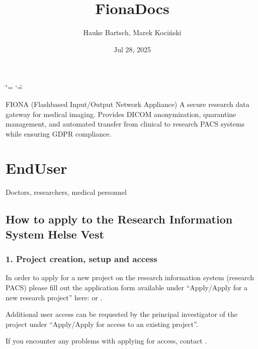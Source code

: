 \documentclass[letterpaper,10pt,english]{sphinxmanual}
\title{FionaDocs}
\date{Jul 28, 2025}
\author{Hauke Bartsch, Marek Kociński}
\begin{document}
\ifdefined\shorthandoff
  \ifnum\catcode`\=\string=\active\shorthandoff{=}\fi
  \ifnum\catcode`\"=\active{}\fi
\fi

\pagestyle{empty}
\sphinxmaketitle
\pagestyle{plain}
\sphinxtableofcontents
\pagestyle{normal}
\label{\detokenize{index::doc}}


\sphinxAtStartPar
FIONA (Flash\sphinxhyphen{}based Input/Output Network Appliance) \sphinxhyphen{} A secure research data gateway for medical imaging. Provides DICOM anonymization, quarantine management, and automated transfer from clinical to research PACS systems while ensuring GDPR compliance.

\sphinxstepscope


\chapter{EndUser}
\label{\detokenize{EndUser/index:enduser}}\label{\detokenize{EndUser/index::doc}}
\sphinxAtStartPar
{} Doctors, researchers, medical personnel

\sphinxstepscope


\section{How to apply to the Research Information System Helse Vest}
\label{\detokenize{EndUser/end-user:how-to-apply-to-the-research-information-system-helse-vest}}\label{\detokenize{EndUser/end-user::doc}}

\subsection{1. Project creation, setup and access}
\label{\detokenize{EndUser/end-user:project-creation-setup-and-access}}
\sphinxAtStartPar
In order to apply for a new project on the research information system (research PACS)
please fill out the application form available under “Apply/Apply for a new research project”
here:  or .

\sphinxAtStartPar
Additional user access can be requested by the principal investigator of the project under
“Apply/Apply for access to an existing project”.

\sphinxAtStartPar
If you encounter any problems with applying for access, contact .
\end{document}
